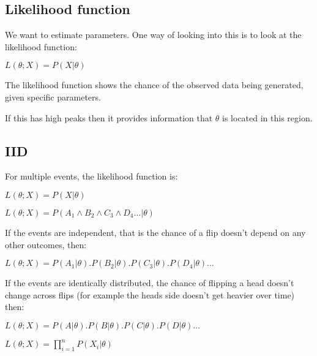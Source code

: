 
\subsection{Likelihood function}

We want to estimate parameters. One way of looking into this is to look at the likelihood function:

\(L(\theta ; X)=P(X|\theta )\)

The likelihood function shows the chance of the observed data being generated, given specific parameters.

If this has high peaks then it provides information that \(\theta \) is located in this region.

\subsection{IID}

For multiple events, the likelihood function is:

\(L(\theta ; X)=P(X|\theta )\)

\(L(\theta ; X)=P(A_1 \land B_2 \land C_3 \land D_4\dots |\theta )\)

If the events are independent, that is the chance of a flip doesn’t depend on any other outcomes, then:

\(L(\theta ; X)=P(A_1|\theta ).P(B_2|\theta ).P(C_3|\theta ).P(D_4|\theta )\dots \)

If the events are identically distributed, the chance of flipping a head doesn’t change across flips (for example the heads side doesn’t get heavier over time) then:

\(L(\theta ; X)=P(A|\theta ).P(B|\theta ).P(C|\theta ).P(D|\theta )\dots \)

\(L(\theta ; X)=\prod_{i=1}^n P(X_i|\theta )\)

